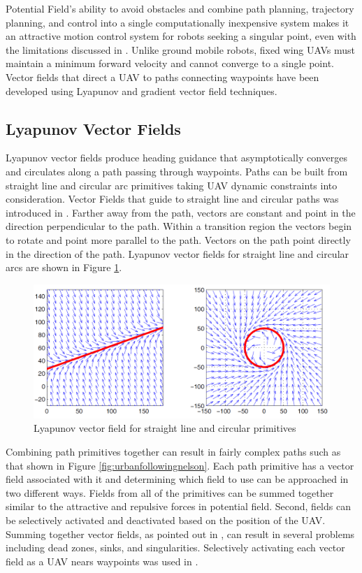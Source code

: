 \documentclass[numbered,pdftex]{ohio-etd}
\begin{document}
Potential Field's ability to avoid obstacles and combine path planning, trajectory planning, and control into a single computationally inexpensive system makes it an attractive motion control system for robots seeking a singular point, even with the limitations discussed in \cite{koren_potential_1991}. Unlike ground mobile robots, fixed wing UAVs must maintain a minimum forward velocity and cannot converge to a single point. Vector fields that direct a UAV to paths connecting waypoints have been developed using Lyapunov and gradient vector field techniques. 
 
 
\subsection{Lyapunov Vector Fields}
Lyapunov vector fields produce heading guidance that asymptotically converges and circulates along a path passing through waypoints. Paths can be built from straight line and circular arc primitives taking UAV dynamic constraints into consideration. Vector Fields that guide to straight line and circular paths was introduced in \cite{nelson_cooperative_2005}. Farther away from the path, vectors are constant and point in the direction perpendicular to the path. Within a transition region the vectors begin to rotate and point more parallel to the path. Vectors on the path point directly in the direction of the path. Lyapunov vector fields for straight line and circular arcs are shown in Figure \ref{fig:nelsonlyapunov}.
\begin{figure}
	\centering
	\includegraphics[width=13cm]{PaperFigures/nelsonLyapunov}
	\caption{Lyapunov vector field for straight line and circular primitives \cite{nelson_cooperative_2005}}
	\label{fig:nelsonlyapunov}
\end{figure}

Combining path primitives together can result in fairly complex paths such as that shown in Figure \ref{fig:urbanfollowingnelson}. Each path primitive has a vector field associated with it and determining which field to use can be approached in two different ways. Fields from all of the primitives can be summed together similar to the attractive and repulsive forces in potential field. Second, fields can be selectively activated and deactivated based on the position of the UAV. Summing together vector fields, as pointed out in \cite{nelson_cooperative_2005}, can result in several problems including dead zones, sinks, and singularities. Selectively activating each vector field as a UAV nears waypoints was used in \cite{nelson_cooperative_2005,nelson_vector_2006,nelson_vector_2007,jung_unmanned_2016}.
\end{document}

